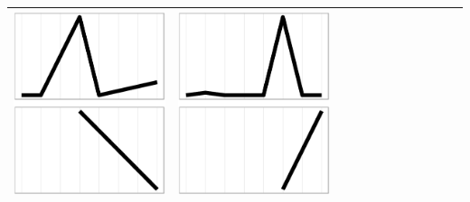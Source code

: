 \documentclass[10pt, conference, compsocconf]{IEEEtran}
\begin{document}
\begin{table}
\begin{tabular}{ | b{1.5cm} | c | c | c | c | c | c | c | c | c | c | c |}
 \includegraphics[scale=0.08]{figures/bbbb.ps} &  
 \includegraphics[scale=0.08]{figures/bbbc.ps} \\
  \hline
  \end{tabular}
\end{table}
\end{document}
